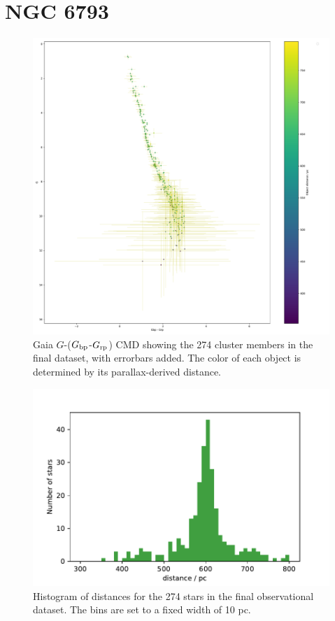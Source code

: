 \documentclass[12pt, a4paper]{report}
\begin{document}
\section{NGC 6793}

\begin{figure}[h]
\begin{center}
\includegraphics[scale=0.45]{../NGC_6793_CMD_observational_errorbars.pdf}
\caption{Gaia $G$-($G_{\textnormal{bp}}$-$G_{\textnormal{rp}}$) CMD showing the 274 cluster members in the final dataset, with errorbars added. The color of each object is determined by its parallax-derived distance.}
\label{NGC_6793_obs_only}
\end{center}
\end{figure}

\begin{figure}[hbt]
\begin{center}
\includegraphics[scale=0.45]{../NGC_6793_distances_hist.pdf}
\caption{Histogram of distances for the 274 stars in the final observational dataset. The bins are set to a fixed width of 10 pc.}
\label{NGC_6793_dist_hist}
\end{center}
\end{figure}
\end{document}
